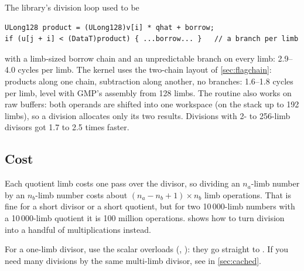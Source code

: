 \begin{perfnote}
The library's division loop used to be
\begin{lstlisting}
ULong128 product = (ULong128)v[i] * qhat + borrow;
if (u[j + i] < (DataT)product) { ...borrow... }   // a branch per limb
\end{lstlisting}
with a limb-sized borrow chain and an unpredictable branch on every limb: 2.9--4.0 cycles per
limb. The  kernel uses the two-chain layout of \cref{sec:flagchain}: products
along one chain, subtraction along another, no branches: 1.6--1.8 cycles per limb, level with
GMP's assembly from 128 limbs. The routine also works on raw buffers: both operands are
shifted into one workspace (on the stack up to 192 limbs), so a division allocates only its
two results. Divisions with 2- to 256-limb divisors got 1.7 to 2.5 times faster.
\end{perfnote}

\subsection{Cost}

Each quotient limb costs one pass over the divisor, so dividing an $n_a$-limb number by an
$n_b$-limb number costs about $(n_a - n_b + 1) \times n_b$ limb operations. That is fine for a
short divisor or a short quotient, but for two 10\,000-limb numbers with a 10\,000-limb
quotient it is 100 million operations.  shows how to turn division into a
handful of multiplications instead.

\begin{practice}
For a one-limb divisor, use the scalar overloads (, ):
they go straight to . If you need many divisions by the same multi-limb divisor,
see  in \cref{sec:cached}.
\end{practice}
